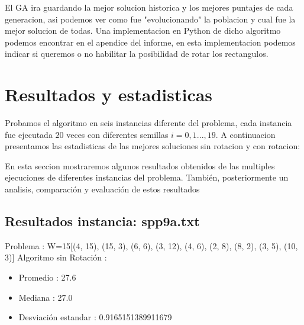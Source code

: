 \documentclass[10pt]{article}
\begin{document}
El GA ira guardando la mejor solucion historica y los mejores puntajes de cada generacion, asi podemos ver como fue "evolucionando" la poblacion y cual fue la mejor solucion de todas. Una implementacion en Python de dicho algoritmo podemos encontrar en el apendice del informe, en esta implementacion podemos indicar si queremos o no habilitar la posibilidad de rotar los rectangulos.

\section{Resultados y estadisticas} %
 
Probamos el algoritmo en seis instancias diferente del problema, cada instancia fue ejecutada $20$ veces con diferentes semillas $i=0,1...,19$. A continuacion presentamos las estadisticas de las mejores soluciones sin rotacion y con rotacion:



\label{sec:Estadisticas}%
En esta seccion mostraremos algunos resultados obtenidos de las multiples ejecuciones de diferentes instancias del problema.%
También, posteriormente un analisis, comparación y evaluación de estos resultados%
\subsection{Resultados instancia: spp9a.txt}%
\label{subsec:Resultadosinstanciaspp9a.txt}%
Problema : W=15{[}(4, 15), (15, 3), (6, 6), (3, 12), (4, 6), (2, 8), (8, 2), (3, 5), (10, 3){]} \newline%
%
 Algoritmo sin Rotación : %
\begin{itemize}%
\item%
Promedio : 27.6%
\item%
Mediana : 27.0%
\item%
Desviación estandar : 0.9165151389911679%
\end{itemize}
\end{document}
